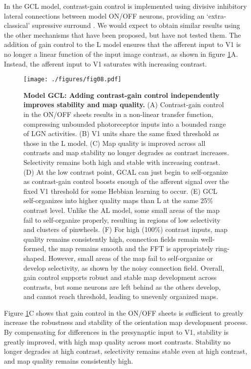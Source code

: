 \documentclass{article}
\def \scalefactor {0.666666}
\def \GaussianScale {\scalefactor}         %
\begin{document}
In the GCL model, contrast-gain control is implemented using divisive
inhibitory lateral connections between model ON/OFF neurons, providing
an `extra-classical' supressive surround
\citep{Felisberti1999,bonin:jn05,Alitto2008}. We would
expect to obtain similar results using the other mechanisms that have
been proposed, but have not tested them.
The addition of gain control to the L model ensures that the afferent
input to V1 is no longer a linear function of the input image
contrast, as shown in figure \ref{fig:gaussian_GCL}A. Instead, the
afferent input to V1 saturates with increasing contrast.
\begin{figure}
\centerline{
\texttt{[image: ./figures/fig08.pdf]}
}
\caption[]{\textbf{Model GCL: Adding contrast-gain control
    independently improves stability and map quality.}
  (A) Contrast-gain control in the ON/OFF sheets results in a
  non-linear transfer function, compressing unbounded photoreceptor
  inputs into a bounded range of LGN activities. (B) V1 units share
  the same fixed threshold as those in the L model. (C) Map quality is
  improved across all contrasts and map stability no longer degrades
  as contrast increases. Selectivity remains both high and stable with
  increasing contrast. (D) At the low contrast point, GCAL can just begin
  to self-organize as contrast-gain control boosts enough of the
  afferent signal over the fixed V1 threshold for some Hebbian
  learning to occur. (E) GCL self-organizes into higher quality maps
  than L at the same 25\% contrast level. Unlike the AL model, some
  small areas of the map fail to self-organize properly, resulting in
  regions of low selectivity and clusters of pinwheels. (F) For high
  (100\%) contrast inputs, map quality remains consistently high,
  connection fields remain well-formed, the map remains smooth and the
  FFT is appropriately ring-shaped. However, small areas of the map
  fail to self-organize or develop selectivity, as shown by the noisy
  connection field.  Overall, gain control supports robust and stable
  map development across contrasts, but some neurons are left behind
  as the others develop, and cannot reach threshold, leading to
  unevenly organized maps.}
\label{fig:gaussian_GCL}
\end{figure}

Figure \ref{fig:gaussian_GCL}C shows that gain control in the ON/OFF
sheets is sufficient to greatly increase the robustness and stability
of the orientation map development process. By compensating for
differences in the presynaptic input to V1, stability is greatly
improved, with high map quality across most contrasts. Stability no
longer degrades at high contrast, selectivity remains stable even at
high contrast, and map quality remains consistently high.
\end{document}
